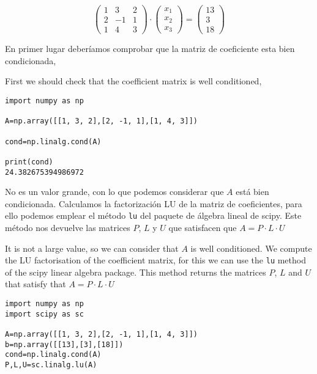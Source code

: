\begin{equation*}
\begin{pmatrix}
1& 3& 2\\
2& -1& 1\\
1& 4& 3
\end{pmatrix}\cdot \begin{pmatrix}
x_1\\
x_2\\
x_3
\end{pmatrix}=\begin{pmatrix}
13\\
3\\
18
\end{pmatrix}
\end{equation*}

\begin{paracol}{2}
    
En primer lugar deberíamos comprobar que la matriz de coeficiente esta bien condicionada,


\switchcolumn
First we should check that the coefficient matrix is well conditioned,

\end{paracol}

\begin{verbatim}
import numpy as np

A=np.array([[1, 3, 2],[2, -1, 1],[1, 4, 3]])

cond=np.linalg.cond(A)

print(cond)
24.382675394986972
\end{verbatim}

\begin{paracol}{2}
No es un valor grande, con lo que podemos considerar que $A$ está bien condicionada. 
Calculamos la factorización LU de la matriz de coeficientes, para ello podemos emplear el método \texttt{lu} del paquete de álgebra lineal de scipy. Este método nos devuelve las matrices $P$, $L$ y $U$ que satisfacen que $A=P \cdot L \cdot U$

\switchcolumn
It is not a large value, so we can consider that $A$ is well conditioned. 
We compute the LU factorisation of the coefficient matrix, for this we can use the \texttt{lu} method of the scipy linear algebra package. This method returns the matrices $P$, $L$ and $U$ that satisfy that $A=P \cdot L \cdot U$

\end{paracol}

\begin{verbatim}
import numpy as np
import scipy as sc 

A=np.array([[1, 3, 2],[2, -1, 1],[1, 4, 3]])
b=np.array([[13],[3],[18]])
cond=np.linalg.cond(A)
P,L,U=sc.linalg.lu(A)

\end{verbatim}


